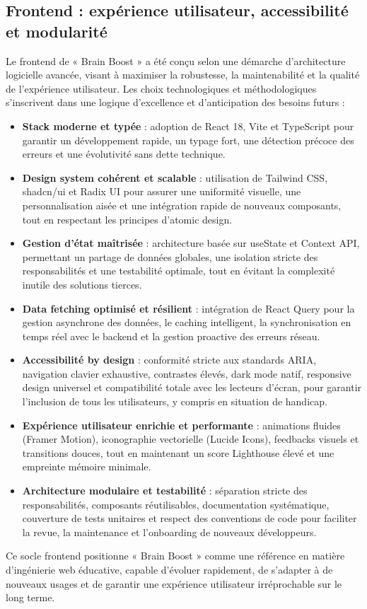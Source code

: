 \documentclass[a4paper,11pt]{report}
\begin{document}
\subsection{Frontend : expérience utilisateur, accessibilité et modularité}
Le frontend de « Brain Boost » a été conçu selon une démarche d'architecture logicielle avancée, visant à maximiser la robustesse, la maintenabilité et la qualité de l'expérience utilisateur. Les choix technologiques et méthodologiques s'inscrivent dans une logique d'excellence et d'anticipation des besoins futurs :
\begin{itemize}
    \item \textbf{Stack moderne et typée} : adoption de React 18, Vite et TypeScript pour garantir un développement rapide, un typage fort, une détection précoce des erreurs et une évolutivité sans dette technique.
    \item \textbf{Design system cohérent et scalable} : utilisation de Tailwind CSS, shadcn/ui et Radix UI pour assurer une uniformité visuelle, une personnalisation aisée et une intégration rapide de nouveaux composants, tout en respectant les principes d'atomic design.
    \item \textbf{Gestion d'état maîtrisée} : architecture basée sur useState et Context API, permettant un partage de données globales, une isolation stricte des responsabilités et une testabilité optimale, tout en évitant la complexité inutile des solutions tierces.
    \item \textbf{Data fetching optimisé et résilient} : intégration de React Query pour la gestion asynchrone des données, le caching intelligent, la synchronisation en temps réel avec le backend et la gestion proactive des erreurs réseau.
    \item \textbf{Accessibilité by design} : conformité stricte aux standards ARIA, navigation clavier exhaustive, contrastes élevés, dark mode natif, responsive design universel et compatibilité totale avec les lecteurs d'écran, pour garantir l'inclusion de tous les utilisateurs, y compris en situation de handicap.
    \item \textbf{Expérience utilisateur enrichie et performante} : animations fluides (Framer Motion), iconographie vectorielle (Lucide Icons), feedbacks visuels et transitions douces, tout en maintenant un score Lighthouse élevé et une empreinte mémoire minimale.
    \item \textbf{Architecture modulaire et testabilité} : séparation stricte des responsabilités, composants réutilisables, documentation systématique, couverture de tests unitaires et respect des conventions de code pour faciliter la revue, la maintenance et l'onboarding de nouveaux développeurs.
\end{itemize}
Ce socle frontend positionne « Brain Boost » comme une référence en matière d'ingénierie web éducative, capable d'évoluer rapidement, de s'adapter à de nouveaux usages et de garantir une expérience utilisateur irréprochable sur le long terme.
\end{document}
